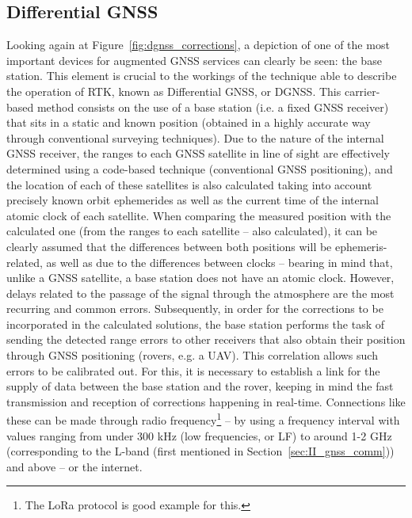 \subsection{Differential GNSS}\label{sec:II_gnssAug_dgnss}

Looking again at Figure~\ref{fig:dgnss_corrections}, a depiction of one of the most important devices for augmented GNSS services can clearly be seen: the base station. This element is crucial to the workings of the technique able to describe the operation of RTK, known as Differential GNSS, or DGNSS. This carrier-based method consists on the use of a base station (i.e. a fixed GNSS receiver) that sits in a static and known position (obtained in a highly accurate way through conventional surveying techniques). Due to the nature of the internal GNSS receiver, the ranges to each GNSS satellite in line of sight are effectively determined using a code-based technique (conventional GNSS positioning), and the location of each of these satellites is also calculated taking into account precisely known orbit ephemerides as well as the current time of the internal atomic clock of each satellite.
When comparing the measured position with the calculated one (from the ranges to each satellite -- also calculated), it can be clearly assumed that the differences between both positions will be ephemeris-related, as well as due to the differences between clocks
-- bearing in mind that, unlike a GNSS satellite, a base station does not have an atomic clock. However, delays related to the passage of the signal through the atmosphere are the most recurring and common errors.
Subsequently, in order for the corrections to be incorporated in the calculated solutions, the base station performs the task of sending the detected range errors to other receivers that also obtain their position through GNSS positioning (rovers, e.g. a UAV). This correlation allows such errors to be calibrated out.
For this, it is necessary to establish a link for the supply of data between the base station and the rover, keeping in mind the fast transmission and reception of corrections happening in real-time. Connections like these can be made through radio frequency\footnote{The LoRa protocol is good example for this.} -- by using a frequency interval with values ranging from under 300 kHz (low frequencies, or LF) to around 1-2 GHz (corresponding to the L-band (first mentioned in Section~\ref{sec:II_gnss_comm})) and above -- or the internet.

